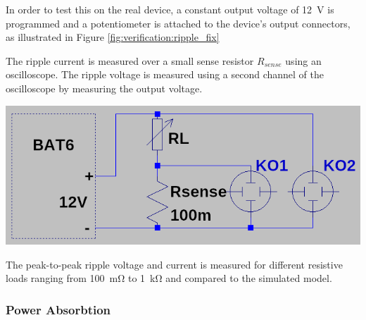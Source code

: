 \begin{minipage}{0.5\textwidth}
    In  order   to  test  this   on  the   real  device,  a   constant  output
    voltage   of  \SI{12}{\volt}   is  programmed   and  a   potentiometer  is
    attached  to the  device's  output connectors,  as  illustrated in  Figure
    \ref{fig:verification:ripple_fix}

    The ripple  current is  measured over a  small sense  resistor $R_{sense}$
    using  an oscilloscope. The  ripple  voltage is  measured  using a  second
    channel of the oscilloscope by measuring the output voltage.
\end{minipage}
\begin{minipage}{0.5\textwidth}
    \centering
    \includegraphics[width=.9\textwidth]{images/sim/ripple-fixture.png}
    \label{fig:verification:ripple_fix}
\end{minipage}

The peak-to-peak ripple voltage  and current is measured for different resistive
loads ranging from \SI{100}{\milli\ohm} to \SI{1}{\kilo\ohm} and compared to the
simulated model.

\subsubsection{Power Absorbtion}

